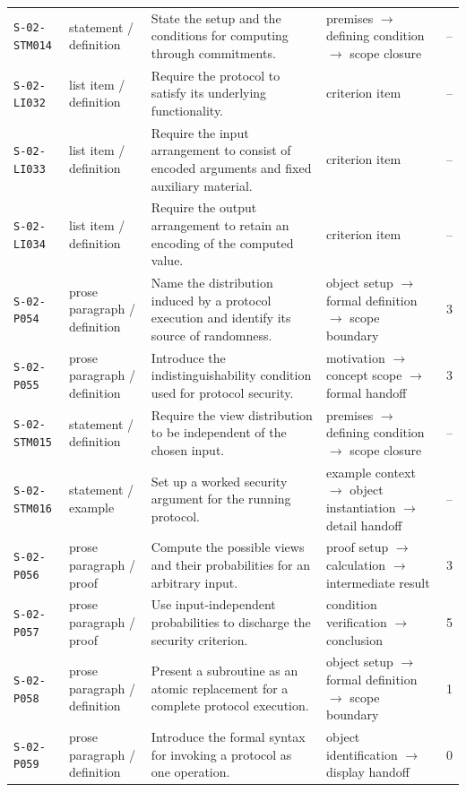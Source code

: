 \documentclass[10pt]{article}
\begin{document}
\begin{longtable}{@{}p{}p{}p{}p{}p{}@{}}
\texttt{S-02-STM014}&statement / definition&State the setup and the conditions for computing through commitments.&premises $\rightarrow$ defining condition $\rightarrow$ scope closure&--\\
\texttt{S-02-LI032}&list item / definition&Require the protocol to satisfy its underlying functionality.&criterion item&--\\
\texttt{S-02-LI033}&list item / definition&Require the input arrangement to consist of encoded arguments and fixed auxiliary material.&criterion item&--\\
\texttt{S-02-LI034}&list item / definition&Require the output arrangement to retain an encoding of the computed value.&criterion item&--\\
\texttt{S-02-P054}&prose paragraph / definition&Name the distribution induced by a protocol execution and identify its source of randomness.&object setup $\rightarrow$ formal definition $\rightarrow$ scope boundary&3\\
\texttt{S-02-P055}&prose paragraph / definition&Introduce the indistinguishability condition used for protocol security.&motivation $\rightarrow$ concept scope $\rightarrow$ formal handoff&3\\
\texttt{S-02-STM015}&statement / definition&Require the view distribution to be independent of the chosen input.&premises $\rightarrow$ defining condition $\rightarrow$ scope closure&--\\
\texttt{S-02-STM016}&statement / example&Set up a worked security argument for the running protocol.&example context $\rightarrow$ object instantiation $\rightarrow$ detail handoff&--\\
\texttt{S-02-P056}&prose paragraph / proof&Compute the possible views and their probabilities for an arbitrary input.&proof setup $\rightarrow$ calculation $\rightarrow$ intermediate result&3\\
\texttt{S-02-P057}&prose paragraph / proof&Use input-independent probabilities to discharge the security criterion.&condition verification $\rightarrow$ conclusion&5\\
\texttt{S-02-P058}&prose paragraph / definition&Present a subroutine as an atomic replacement for a complete protocol execution.&object setup $\rightarrow$ formal definition $\rightarrow$ scope boundary&1\\
\texttt{S-02-P059}&prose paragraph / definition&Introduce the formal syntax for invoking a protocol as one operation.&object identification $\rightarrow$ display handoff&0\\

\end{longtable}
\end{document}

